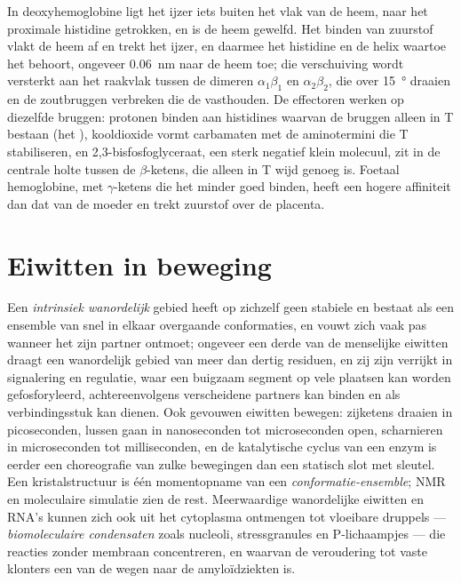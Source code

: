 \begin{proposition}\label{prop:b3:structural-biology:mechanism}
In deoxyhemoglobine ligt het ijzer iets buiten het vlak van de heem,
naar het proximale histidine getrokken, en is de heem gewelfd. Het
binden van zuurstof vlakt de heem af en trekt het ijzer, en daarmee het
histidine en de helix waartoe het behoort, ongeveer \qty{0.06}{nm} naar
de heem toe; die verschuiving wordt versterkt aan het raakvlak tussen
de dimeren $\alpha_{1}\beta_{1}$ en $\alpha_{2}\beta_{2}$, die over
\qty{15}{\degree} draaien en de zoutbruggen verbreken die de
 vasthouden. De effectoren werken op diezelfde bruggen:
protonen binden aan histidines waarvan de bruggen alleen in T bestaan
(het ), kooldioxide vormt carbamaten met de aminotermini die
T stabiliseren, en 2,3-bisfosfoglyceraat, een sterk negatief klein
molecuul, zit in de centrale holte tussen de $\beta$-ketens, die alleen
in T wijd genoeg is. Foetaal hemoglobine, met $\gamma$-ketens die het
minder goed binden, heeft een hogere affiniteit dan dat van de moeder
en trekt zuurstof over de placenta.
\end{proposition}

\section{Eiwitten in beweging}

\begin{definition}\label{def:b3:structural-biology:disorder}
Een \emph{intrinsiek wanordelijk} gebied heeft op zichzelf geen
stabiele  en bestaat als een ensemble van snel in elkaar
overgaande conformaties, en vouwt zich vaak pas wanneer het zijn
partner ontmoet; ongeveer een derde van de menselijke eiwitten draagt
een wanordelijk gebied van meer dan dertig residuen, en zij zijn
verrijkt in signalering en regulatie, waar een buigzaam segment op vele
plaatsen kan worden gefosforyleerd, achtereenvolgens verscheidene
partners kan binden en als verbindingsstuk kan dienen. Ook gevouwen
eiwitten bewegen: zijketens draaien in picoseconden, lussen gaan in
nanoseconden tot microseconden open,  scharnieren in
microseconden tot milliseconden, en de katalytische cyclus van een
enzym is eerder een choreografie van zulke bewegingen dan een statisch
slot met sleutel. Een kristalstructuur is één momentopname van een
\emph{conformatie-ensemble}; NMR en moleculaire simulatie zien de rest.
Meerwaardige wanordelijke eiwitten en RNA's kunnen zich ook uit het
cytoplasma ontmengen tot vloeibare druppels --- \emph{biomoleculaire
condensaten} zoals nucleoli, stressgranules en P-lichaampjes --- die
reacties zonder membraan concentreren, en waarvan de veroudering tot
vaste klonters een van de wegen naar de amyloïdziekten is.
\end{definition}

